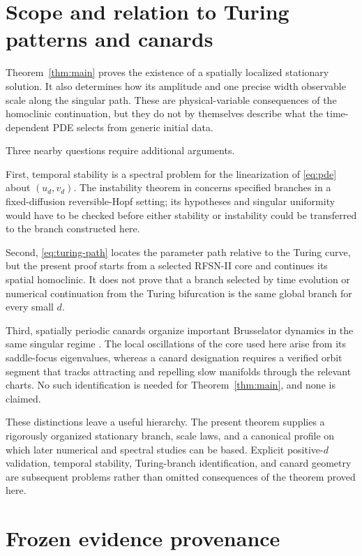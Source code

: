 \documentclass[11pt,reqno]{amsart}
\numberwithin{equation}{section}
\theoremstyle{remark}
\begin{document}
\section{Scope and relation to Turing patterns and canards}\label{sec:scope}

Theorem~\ref{thm:main} proves the existence of a spatially localized
stationary solution.  It also determines how its amplitude and one precise
width observable scale along the singular path.  These are physical-variable
consequences of the homoclinic continuation, but they do not by themselves
describe what the time-dependent PDE selects from generic initial data.

Three nearby questions require additional arguments.

First, temporal stability is a spectral problem for the linearization of
\eqref{eq:pde} about $(u_d,v_d)$.  The instability theorem in
\cite{GlebskyLerman1997} concerns specified branches in a fixed-diffusion
reversible-Hopf setting; its hypotheses and singular uniformity would have to
be checked before either stability or instability could be transferred to
the branch constructed here.

Second, \eqref{eq:turing-path} locates the parameter path relative to the
Turing curve, but the present proof starts from a selected RFSN-II core and
continues its spatial homoclinic.  It does not prove that a branch selected by
time evolution or numerical continuation from the Turing bifurcation is the
same global branch for every small $d$.

Third, spatially periodic canards organize important Brusselator dynamics in
the same singular regime \cite{JencksEtAl2026}.  The local oscillations of the
core used here arise from its saddle-focus eigenvalues, whereas a canard
designation requires a verified orbit segment that tracks attracting and
repelling slow manifolds through the relevant charts.  No such identification
is needed for Theorem~\ref{thm:main}, and none is claimed.

These distinctions leave a useful hierarchy.  The present theorem supplies
a rigorously organized stationary branch, scale laws, and a canonical profile
on which later numerical and spectral studies can be based.  Explicit
positive-$d$ validation, temporal stability, Turing-branch identification,
and canard geometry are subsequent problems rather than omitted consequences
of the theorem proved here.

\appendix

\section{Frozen evidence provenance}\label{app:evidence}
\end{document}
